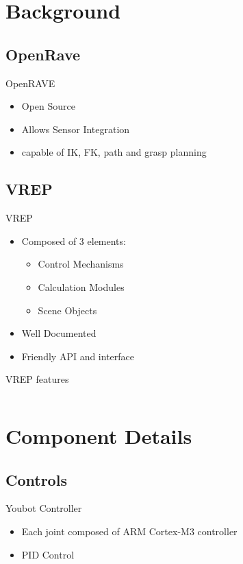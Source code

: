 \documentclass[pdf]{beamer}
\begin{document}
\section{Background}
\subsection{OpenRave}
\begin{frame}{OpenRAVE}
  \begin{itemize}
  \item Open Source
  \item Allows Sensor Integration
  \item capable of IK, FK, path and grasp planning
  \end{itemize}
\end{frame}

\subsection{VREP}
\begin{frame}{VREP}
  \begin{itemize}
  \item Composed of 3 elements:
    \begin{itemize}
    \item Control Mechanisms
    \item Calculation Modules
    \item Scene Objects
    \end{itemize}
  \item Well Documented
  \item Friendly API and interface
  \end{itemize}
\end{frame}

\begin{frame}{VREP features}
  \begin{columns}
  \end{columns}
\end{frame}

\section{Component Details}

\subsection{Controls}
\begin{frame}{Youbot Controller}
  \begin{itemize}
  \item Each joint composed of ARM Cortex-M3 controller
  \item PID Control
  \end{itemize}
\end{frame}
\end{document}
